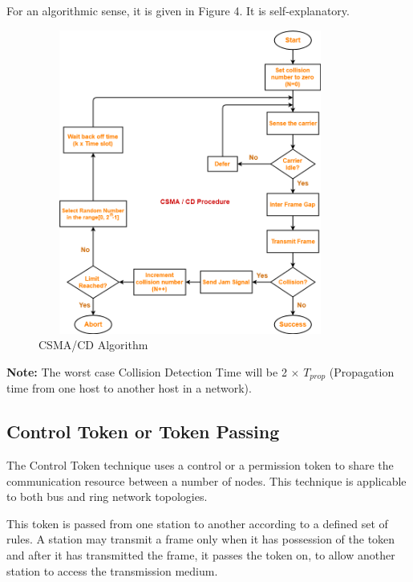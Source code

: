\documentclass[12pt]{article}
\begin{document}
For an algorithmic sense, it is given in Figure 4. It is self-explanatory. \\

\begin{figure}
    \centering
    \includegraphics[width=10cm, height=10cm]{csma_algo.png}
    \caption{CSMA/CD Algorithm}
\end{figure}

\textbf{Note:} The worst case Collision Detection Time will be 2 $\times$ $T_{prop}$ (Propagation time from one host to another host in a network).


\subsection{Control Token or Token Passing}
The Control Token technique uses a control or a permission token to share the communication resource between a number of nodes. This technique is applicable to both bus and ring network topologies.

This token is passed from one station to another according to a defined set of rules. A station may transmit a frame only when it has possession of the token and after it has transmitted the frame, it passes the token on, to allow another station to access the transmission medium.
\end{document}
